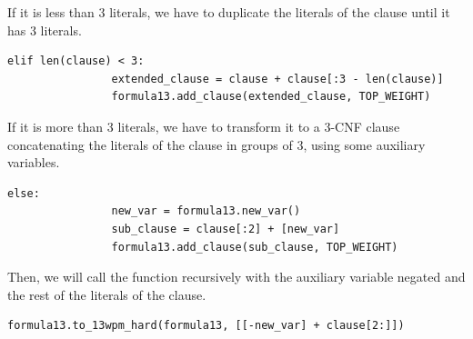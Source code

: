 \documentclass[11pt]{article}
\begin{document}
        If it is less than 3 literals, we have to duplicate the literals of the clause until it has 3 literals.
        \begin{lstlisting}[label={lst:lstlisting8}]
            elif len(clause) < 3:
                extended_clause = clause + clause[:3 - len(clause)]
                formula13.add_clause(extended_clause, TOP_WEIGHT)
        \end{lstlisting}

        If it is more than 3 literals, we have to transform it to a 3-CNF clause concatenating the literals of the clause in groups of 3, using some auxiliary variables.
        \begin{lstlisting}[label={lst:lstlisting9}]
            else:
                new_var = formula13.new_var()
                sub_clause = clause[:2] + [new_var]
                formula13.add_clause(sub_clause, TOP_WEIGHT)
        \end{lstlisting}
            Then, we will call the function recursively with the auxiliary variable negated and the rest of the literals of the clause.
            \begin{lstlisting}[label={lst:lstlisting10}]
                formula13.to_13wpm_hard(formula13, [[-new_var] + clause[2:]])
            \end{lstlisting}
\end{document}
